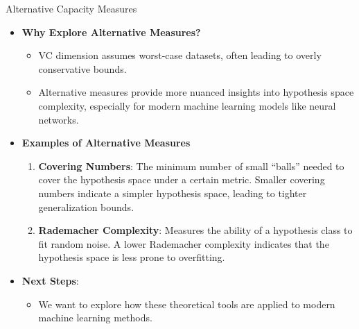 \documentclass[
  ignorenonframetext,
]{beamer}
\providecommand{\tightlist}{%
  \setlength{\itemsep}{0pt}\setlength{\parskip}{0pt}}\usepackage{longtable,booktabs,array}
\begin{document}
\begin{frame}{Alternative Capacity Measures}
\label{alternative-capacity-measures}
\begin{itemize}
\tightlist
\item
  \textbf{Why Explore Alternative Measures?}

  \begin{itemize}
  \tightlist
  \item
    VC dimension assumes worst-case datasets, often leading to overly
    conservative bounds.
  \item
    Alternative measures provide more nuanced insights into hypothesis
    space complexity, especially for modern machine learning models like
    neural networks.
  \end{itemize}
\end{itemize}
\end{frame}

\begin{frame}
\begin{itemize}
\tightlist
\item
  \textbf{Examples of Alternative Measures}

  \begin{enumerate}
  \tightlist
  \item
    \textbf{Covering Numbers}: The minimum number of small ``balls''
    needed to cover the hypothesis space under a certain metric. Smaller
    covering numbers indicate a simpler hypothesis space, leading to
    tighter generalization bounds.
  \item
    \textbf{Rademacher Complexity}: Measures the ability of a hypothesis
    class to fit random noise. A lower Rademacher complexity indicates
    that the hypothesis space is less prone to overfitting.
  \end{enumerate}
\item
  \textbf{Next Steps}:

  \begin{itemize}
  \tightlist
  \item
    We want to explore how these theoretical tools are applied to modern
    machine learning methods.
  \end{itemize}
\end{itemize}
\end{frame}
\end{document}
